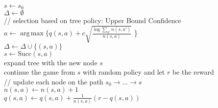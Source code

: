 \documentclass[landscape,a0paper,fontscale=0.285]{baposter}
\DeclareMathOperator*{\argmax}{arg\,max}
\begin{document}
\begin{poster}
{\begin{algorithm}[H]
  \DontPrintSemicolon
   {
    $ s \gets s_0 $ \\
    $ \Delta \gets \emptyset$ \\
    // selection based on tree policy: Upper Bound Confidence \\
     {
      $a  \gets \argmax \{ q(s, a) + c \sqrt{\frac{\log \sum_{a'}n(s, a')}{n(s,a)}}$ \}\\
      $\Delta \gets \Delta \cup \{(s, a)\}  $ \\
      $s \gets \text{Succ}(s, a) $\\
    }
    expand tree with the new node $s$ \\
    continue the game from $s$ with random policy and let $r$ be the reward \\
    // update each node on the path $s_0 \rightarrow ... \rightarrow s$ \\
     {
      $ n(s, a) \gets n(s,a) + 1 $ \\
      $ q(s, a) \gets q(s,a) +  \frac{1}{n(s,a)} (r - q(s,a))$ \\
    }
  }
  \Return{$\argmax_{a} q(s_0, a) $}
\end{algorithm}

}







\end{poster}
\end{document}
